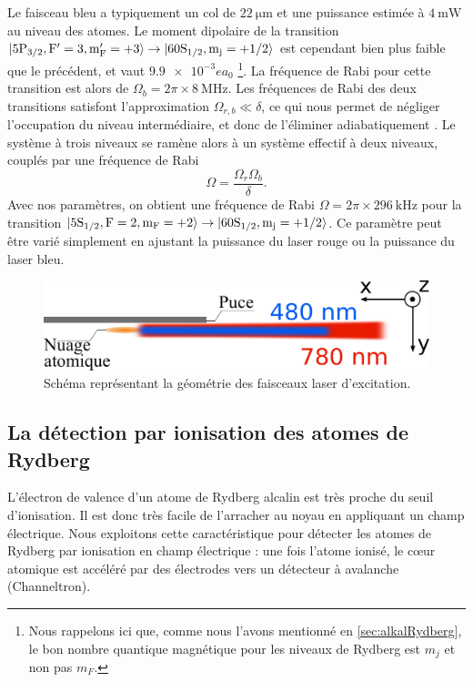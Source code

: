 Le faisceau bleu a typiquement un col de $\SI{22}{\um}$ et une puissance estimée à $\SI{4}{\milli\watt}$ au niveau des atomes.
Le moment dipolaire de la transition $ \ket{\mathrm{5P_{3/2},F'=3,m_F'=+3}} \rightarrow \ket{\mathrm{60S_{1/2},m_j=+1/2}}$ est cependant bien plus faible que le précédent, et vaut $\SI{9.9e-3} ea_0$
\footnote{Nous rappelons ici que, comme nous l'avons mentionné en \ref{sec:alkalRydberg}, le bon nombre quantique magnétique pour les niveaux de Rydberg est $m_j$ et non pas $m_F$.}.
La fréquence de Rabi pour cette transition est alors de $\Omega_b = 2\pi\times \SI{8}{\MHz}$.
Les fréquences de Rabi des deux transitions satisfont l'approximation $\Omega_{r,b} \ll \delta$, ce qui nous permet de négliger l'occupation du niveau intermédiaire, et donc de l'éliminer adiabatiquement \cite{TXT_ASPECTFABRE_QUANTOPT}.
Le système à trois niveaux se ramène alors à un système effectif à deux niveaux, couplés par une fréquence de Rabi
\begin{equation}
\label{eq:Rabi_2photons}
\Omega = \frac{\Omega_r \Omega_b}{\delta}.
\end{equation}
Avec nos paramètres, on obtient une fréquence de Rabi $\Omega = 2\pi \times \SI{296}{\kHz}$ pour la transition $\ket{\mathrm{5S_{1/2},F=2,m_F=+2}} \rightarrow \ket{\mathrm{60S_{1/2},m_j=+1/2}}$.
Ce paramètre peut être varié simplement en ajustant la puissance du laser rouge ou la puissance du laser bleu.

%
\begin{figure}[!h]
\centering
\includegraphics[width=.6\linewidth]{figures/setup/rydberg/lasers_excit}
\caption[Faisceaux laser pour l'excitation des Rydberg]{Schéma représentant la géométrie des faisceaux laser d'excitation.
}
\label{fig:lasers_excit}
\end{figure}

\subsection{La détection par ionisation des atomes de Rydberg}\label{subsec:detection}
\noindent L'électron de valence d'un atome de Rydberg alcalin est très proche du seuil d'ionisation.
Il est donc très facile de l'arracher au noyau en appliquant un champ électrique.
Nous exploitons cette caractéristique pour détecter les atomes de Rydberg par ionisation en champ électrique :
une fois l'atome ionisé, le c\oe ur atomique est accéléré par des électrodes vers un détecteur à avalanche (Channeltron).


